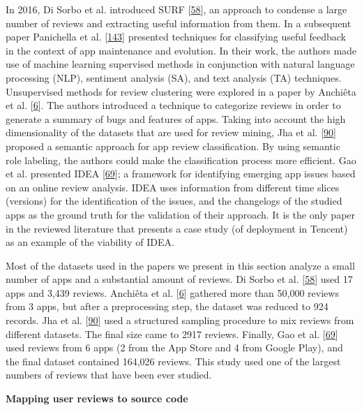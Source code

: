 \documentclass[]{book}
\begin{document}
In 2016, Di Sorbo et al. introduced SURF
{[}\protect\hyperlink{ref-di2016would}{58}{]}, an approach to condense a
large number of reviews and extracting useful information from them. In
a subsequent paper Panichella et al.
{[}\protect\hyperlink{ref-panichella2016ardoc}{143}{]} presented
techniques for classifying useful feedback in the context of app
maintenance and evolution. In their work, the authors made use of
machine learning supervised methods in conjunction with natural language
processing (NLP), sentiment analysis (SA), and text analysis (TA)
techniques. Unsupervised methods for review clustering were explored in
a paper by Anchiêta et al.
{[}\protect\hyperlink{ref-anchieta2017}{6}{]}. The authors introduced a
technique to categorize reviews in order to generate a summary of bugs
and features of apps. Taking into account the high dimensionality of the
datasets that are used for review mining, Jha et al.
{[}\protect\hyperlink{ref-jha2017mining}{90}{]} proposed a semantic
approach for app review classification. By using semantic role labeling,
the authors could make the classification process more efficient. Gao et
al. presented IDEA {[}\protect\hyperlink{ref-gao2018online}{69}{]}; a
framework for identifying emerging app issues based on an online review
analysis. IDEA uses information from different time slices (versions)
for the identification of the issues, and the changelogs of the studied
apps as the ground truth for the validation of their approach. It is the
only paper in the reviewed literature that presents a case study (of
deployment in Tencent) as an example of the viability of IDEA.

Most of the datasets used in the papers we present in this section
analyze a small number of apps and a substantial amount of reviews. Di
Sorbo et al. {[}\protect\hyperlink{ref-di2016would}{58}{]} used 17 apps
and 3,439 reviews. Anchiêta et al.
{[}\protect\hyperlink{ref-anchieta2017}{6}{]} gathered more than 50,000
reviews from 3 apps, but after a preprocessing step, the dataset was
reduced to 924 records. Jha et al.
{[}\protect\hyperlink{ref-jha2017mining}{90}{]} used a structured
sampling procedure to mix reviews from different datasets. The final
size came to 2917 reviews. Finally, Gao et al.
{[}\protect\hyperlink{ref-gao2018online}{69}{]} used reviews from 6 apps
(2 from the App Store and 4 from Google Play), and the final dataset
contained 164,026 reviews. This study used one of the largest numbers of
reviews that have been ever studied.

\textbf{Mapping user reviews to source code}
\end{document}
